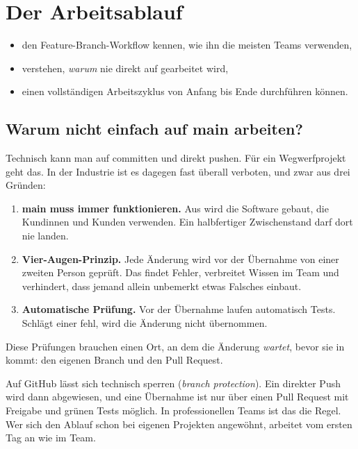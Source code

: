 \chapter{Der Arbeitsablauf}
\label{kap:ablauf}

\begin{lernziele}
\begin{itemize}[nosep]
  \item den Feature-Branch-Workflow kennen, wie ihn die meisten Teams verwenden,
  \item verstehen, \emph{warum} nie direkt auf  gearbeitet wird,
  \item einen vollständigen Arbeitszyklus von Anfang bis Ende durchführen können.
\end{itemize}
\end{lernziele}

\section{Warum nicht einfach auf main arbeiten?}

Technisch kann man auf  committen und direkt pushen. Für ein Wegwerfprojekt geht
das. In der Industrie ist es dagegen fast überall verboten, und zwar aus drei Gründen:

\begin{enumerate}
  \item \textbf{main muss immer funktionieren.} Aus  wird die Software gebaut,
        die Kundinnen und Kunden verwenden. Ein halbfertiger Zwischenstand darf dort nie landen.
  \item \textbf{Vier-Augen-Prinzip.} Jede Änderung wird vor der Übernahme von einer zweiten
        Person geprüft. Das findet Fehler, verbreitet Wissen im Team und verhindert, dass
        jemand allein unbemerkt etwas Falsches einbaut.
  \item \textbf{Automatische Prüfung.} Vor der Übernahme laufen automatisch Tests. Schlägt
        einer fehl, wird die Änderung nicht übernommen.
\end{enumerate}

Diese Prüfungen brauchen einen Ort, an dem die Änderung \emph{wartet}, bevor sie in
 kommt: den eigenen Branch und den Pull Request.

\begin{praxis}
Auf GitHub lässt sich  technisch sperren (\emph{branch protection}). Ein direkter
Push wird dann abgewiesen, und eine Übernahme ist nur über einen Pull Request mit
Freigabe und grünen Tests möglich. In professionellen Teams ist das die Regel. Wer sich
den Ablauf schon bei eigenen Projekten angewöhnt, arbeitet vom ersten Tag an wie im Team.
\end{praxis}

